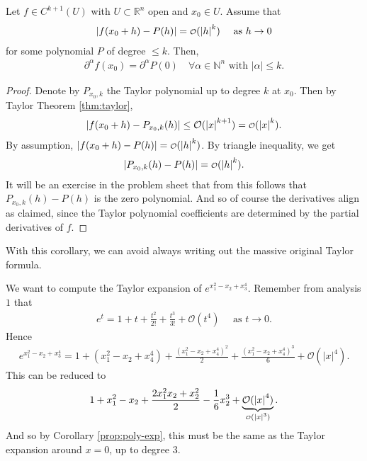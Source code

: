 \begin{prop}\label{prop:poly-exp}
    Let $f \in C^{k+1}(U)$ with $U \subset \mathbb{R}^{n}$ open and $x_{0} \in U$. Assume that 
    \begin{align*}
        \left| f(x_{0}+h) - P(h) \right| = \smalO(\left| h \right|^{k}) \quad \text{ as } h \to 0
    \end{align*}
    for some polynomial $P$ of degree $\leq k$. Then, 
    \begin{align*}
        \partial^{\alpha }f(x_{0}) = \partial^{\alpha } P(0) \quad \forall \alpha \in \mathbb{N}^{n} \text{ with } \left| \alpha  \right| \leq k.
    \end{align*}
\end{prop}
\begin{proof}
    Denote by $P_{x_{0},k}$ the Taylor polynomial up to degree $k$ at $x_{0}$. Then by Taylor Theorem \ref{thm:taylor},
    \begin{align*}
        \left| f(x_{0}+h) - P_{x_{0},k}(h) \right| \leq \mathcal{O}(\left| x \right|^{k+1}) = \smalO(\left| x \right|^{k}).
    \end{align*}
    By assumption, $\left| f(x_{0}+h)-P(h) \right| = \smalO(\left| h \right|^{k})$. By triangle inequality, we get
    \begin{align*}
        \left| P_{x_{0},k}(h) - P(h) \right| = \smalO(\left| h \right|^{k}).
    \end{align*}
    It will be an exercise in the problem sheet that from this follows that $P_{x_{0},k}(h) - P(h)$ is the zero polynomial. And so of course the derivatives align as claimed, since the Taylor polynomial coefficients are determined by the partial derivatives of $f$.
\end{proof}

\begin{eg} 
    With this corollary, we can avoid always writing out the massive original Taylor formula.

    We want to compute the Taylor expansion of $e^{ x_{1}^{2} - x_{2} + x_{3}^{4} }$. Remember from analysis $1$ that 
    \begin{align*}
        e^{ t } = 1 + t + \frac{t^{2}}{2!} + \frac{t^{3}}{3!} + \mathcal{O}(t^{4}) \quad \text{ as } t \to 0.
    \end{align*}
    Hence 
    \begin{align*}
        e^{ x_{1}^{2} - x_{2} + x_{3}^{4} } = 1 + (x_{1}^{2} - x_{2} + x_{4}^{4}) + \frac{(x_{1}^{2} - x_{2} + x_{4}^{4})^{2}}{2} + \frac{(x_{1}^{2} - x_{2} + x_{4}^{4})^{3}}{6} + \mathcal{O}(\left| x \right|^{4}).
    \end{align*}
    This can be reduced to
    \begin{align*}
        1 + x_{1}^{2} - x_{2} + \frac{2x_{1}^{2}x_{2} + x_{2}^{2}}{2} - \frac{1}{6}x_{2}^{3} + \underbrace{\mathcal{O}(\left| x \right|^{4})}_{\smalO(\left| x \right|^{3})}.
    \end{align*}
    And so by Corollary \ref{prop:poly-exp}, this must be the same as the Taylor expansion around $x = 0$, up to degree $3$.
\end{eg}

